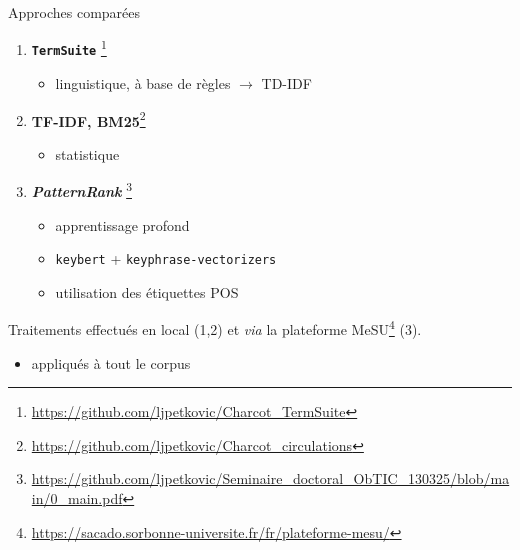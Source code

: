 \begin{frame}{Approches comparées}
	\begin{enumerate}
		\item \textcolor{deepblue}{\textbf{\texttt{TermSuite}}} \footnote{\url{https://github.com/ljpetkovic/Charcot_TermSuite}} \citep{cram2016terminology}
		\begin{itemize}
			\item linguistique, à base de règles $\rightarrow$ TD-IDF
		\end{itemize} 
		\item \textcolor{deepblue}{\textbf{TF-IDF, BM25}}\footnote{\url{https://github.com/ljpetkovic/Charcot_circulations}} \citep{robertson1976relevance}  
		\begin{itemize}
			\item statistique
		\end{itemize}
		\item \textcolor{deepblue}{\textbf{\textit{PatternRank}}} \citep{schopf2022}\footnote{\url{https://github.com/ljpetkovic/Seminaire_doctoral_ObTIC_130325/blob/main/0_main.pdf}}
		\begin{itemize}
			\item apprentissage profond
			\item \texttt{keybert} + \texttt{keyphrase-vectorizers}
			\item utilisation des étiquettes POS
		\end{itemize} 
	\end{enumerate}
	
	\begin{block}{\vspace*{-0.6mm}}
		Traitements effectués en local (1,2) et \textit{via} la plateforme MeSU\footnote{\url{https://sacado.sorbonne-universite.fr/fr/plateforme-mesu/}} (3).
		\begin{itemize}
			\item appliqués à tout le corpus
		\end{itemize}
	\end{block}
	
\end{frame}
